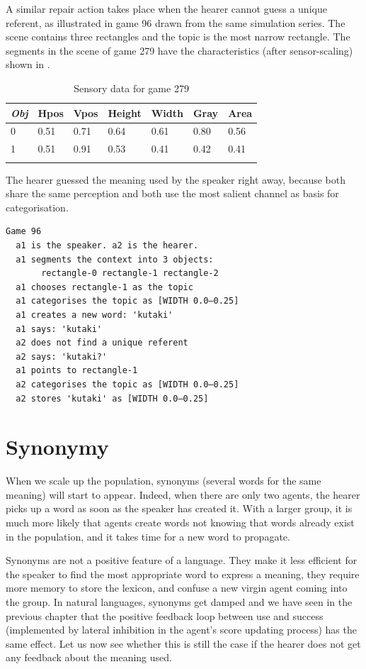 A similar repair action takes place when the hearer
cannot guess a unique referent, as illustrated in
game 96 drawn from the same simulation series. 
The scene contains three rectangles and the 
topic is the most narrow rectangle. The segments in the scene of game 279
have the characteristics (after sensor-scaling) shown in . 


\begin{table}
\begin{center}
\begin{tabular}{ l  l  l  l  l  l  l }
\lsptoprule
{\itshape Obj}&Hpos&Vpos&Height&Width&Gray&Area \\ \midrule
0 &0.51 & 0.71 & 0.64 & 0.61 & 0.80 & 0.56\\ 
1 & 0.51 & 0.91 & 0.53 & 0.41 & 0.42 & 0.41 \\ 
\lspbottomrule
\end{tabular}
\caption{\label{tab:279}Sensory data for game 279}
\end{center}
\end{table}
The hearer guessed the meaning used
by the speaker right away, because both 
share the same perception and both use the most 
salient channel as basis for categorisation. 
\begin{verbatim}
Game 96
  a1 is the speaker. a2 is the hearer. 
  a1 segments the context into 3 objects: 
       rectangle-0 rectangle-1 rectangle-2
  a1 chooses rectangle-1 as the topic 
  a1 categorises the topic as [WIDTH 0.0–0.25]
  a1 creates a new word: 'kutaki'
  a1 says: 'kutaki'
  a2 does not find a unique referent
  a2 says: 'kutaki?'
  a1 points to rectangle-1
  a2 categorises the topic as [WIDTH 0.0–0.25]
  a2 stores 'kutaki' as [WIDTH 0.0–0.25]
\end{verbatim}

\section{Synonymy}

When we scale up the population, synonyms (several words
for the same meaning) will start to appear. Indeed,
when there are only two agents, the hearer picks 
up a word as soon as the speaker has created it. With a larger
group, it is much more likely that agents create words
not knowing that words already exist in the population, and 
it takes time for a new word to propagate. 

Synonyms are not a positive feature of a language. They make 
it less efficient for the speaker to find the most 
appropriate word to express a meaning, they require more
memory to store the lexicon, and confuse a new virgin 
agent coming into the group. In natural languages, synonyms get
damped and we have seen in the previous chapter
that the positive feedback loop between 
use and success (implemented by lateral inhibition
in the agent's score updating process) has the same
effect. Let us now see whether this is still the 
case if the hearer does not get any feedback about the
meaning used. 

